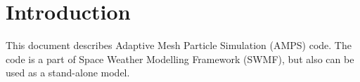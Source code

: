 \chapter{Introduction}

This document describes Adaptive Mesh Particle Simulation (AMPS) code.
The code is a part of Space Weather Modelling Framework (SWMF), but also
can be used as a stand-alone model.
